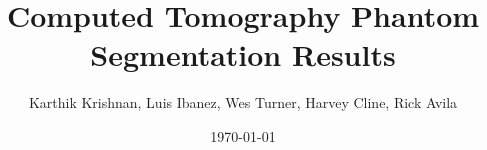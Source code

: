 \documentclass{InsightArticle}
\title{Computed Tomography Phantom Segmentation Results}
\author{Karthik Krishnan, Luis Ibanez, Wes Turner, Harvey Cline, Rick Avila}
\date{\today}
\begin{document}
\ifpdf
\else
\fi

\newcommand{\composeFigureFromDatasetFeatures}[1]{

\subsubsection{Feature Generator Results for Dataset #1}

\begin{figure}
\center
\texttt{[image: GMSFG\_Test\#1.png]}
\itkcaption[Dataset #1 Gradient Magnitude Sigmoid Feature]{Dataset #1 Results of Gradient Magnitude Sigmoid Feature Generator.}
\label{fig:Dataset#1GMSFG}
\end{figure}
\clearpage

\begin{figure}
\center
\texttt{[image: SFG\_Test\#1.png]}
\itkcaption[Dataset #1 Sigmoid Feature]{Dataset #1 Results of Sigmoid Feature Generator.}
\label{fig:Dataset#1SFG}
\end{figure}
\clearpage

\begin{figure}
\center
\texttt{[image: LWFG\_Test\#1.png]}
\itkcaption[Dataset #1 Lung Wall Feature]{Dataset #1 Results of Lung Wall Feature Generator.}
\label{fig:Dataset#1LWFG}
\end{figure}
\clearpage

\begin{figure}
\center
\texttt{[image: MOFG\_Test\#1.png]}
\itkcaption[Dataset #1 Morphological Openning Feature]{Dataset #1 Results of Morphological Openning Feature Generator.}
\label{fig:Dataset#1MOFG}
\end{figure}
\clearpage

\begin{figure}
\center
\texttt{[image: SVFG\_Test\#1.png]}
\itkcaption[Dataset #1 Sato Vesselness Feature]{Dataset #1 Results of Sato Vesselness Feature Generator.}
\label{fig:Dataset#1SVFG}
\end{figure}
\clearpage

}
\end{document}
